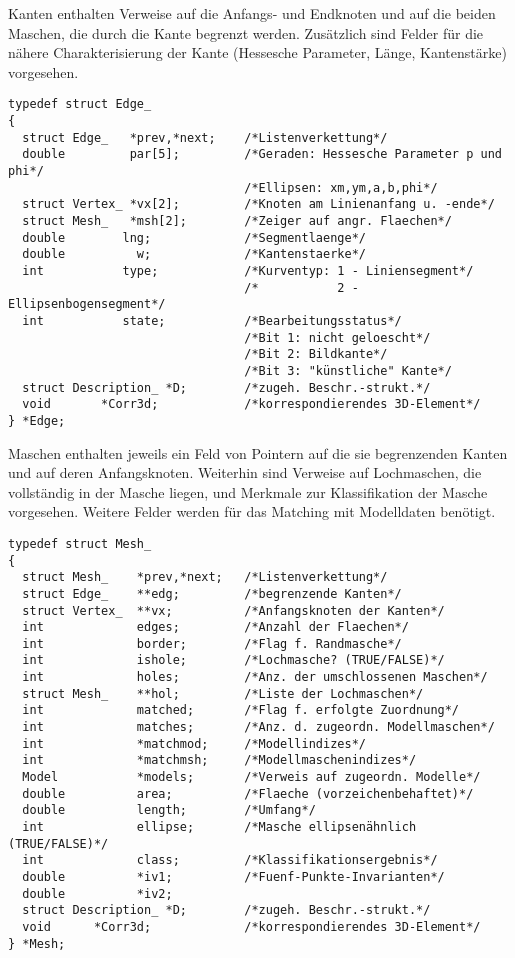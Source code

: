 Kanten enthalten Verweise auf die Anfangs- und Endknoten und auf die beiden
Maschen, die durch die Kante begrenzt werden. Zusätzlich sind Felder für die
nähere Charakterisierung der Kante (Hessesche Parameter, Länge, Kantenstärke)
vorgesehen.
\begprogr\begin{verbatim}
typedef struct Edge_
{ 
  struct Edge_   *prev,*next;    /*Listenverkettung*/
  double         par[5];         /*Geraden: Hessesche Parameter p und phi*/
                                 /*Ellipsen: xm,ym,a,b,phi*/
  struct Vertex_ *vx[2];         /*Knoten am Linienanfang u. -ende*/
  struct Mesh_   *msh[2];        /*Zeiger auf angr. Flaechen*/
  double        lng;             /*Segmentlaenge*/
  double          w;             /*Kantenstaerke*/
  int           type;            /*Kurventyp: 1 - Liniensegment*/
                                 /*           2 - Ellipsenbogensegment*/
  int           state;           /*Bearbeitungsstatus*/
                                 /*Bit 1: nicht geloescht*/
                                 /*Bit 2: Bildkante*/
                                 /*Bit 3: "künstliche" Kante*/
  struct Description_ *D;        /*zugeh. Beschr.-strukt.*/
  void       *Corr3d;            /*korrespondierendes 3D-Element*/
} *Edge;
\end{verbatim}\endprogr

Maschen enthalten jeweils ein Feld von Pointern auf die sie begrenzenden Kanten
und auf deren Anfangsknoten. Weiterhin sind Verweise auf Lochmaschen, die
vollständig in der Masche liegen, und Merkmale zur Klassifikation der Masche
vorgesehen. Weitere Felder werden für das Matching mit Modelldaten benötigt.
\begprogr\begin{verbatim}
typedef struct Mesh_
{
  struct Mesh_    *prev,*next;   /*Listenverkettung*/
  struct Edge_    **edg;         /*begrenzende Kanten*/
  struct Vertex_  **vx;          /*Anfangsknoten der Kanten*/
  int             edges;         /*Anzahl der Flaechen*/
  int             border;        /*Flag f. Randmasche*/
  int             ishole;        /*Lochmasche? (TRUE/FALSE)*/
  int             holes;         /*Anz. der umschlossenen Maschen*/
  struct Mesh_    **hol;         /*Liste der Lochmaschen*/
  int             matched;       /*Flag f. erfolgte Zuordnung*/
  int             matches;       /*Anz. d. zugeordn. Modellmaschen*/
  int             *matchmod;     /*Modellindizes*/
  int             *matchmsh;     /*Modellmaschenindizes*/
  Model           *models;       /*Verweis auf zugeordn. Modelle*/
  double          area;          /*Flaeche (vorzeichenbehaftet)*/
  double          length;        /*Umfang*/
  int             ellipse;       /*Masche ellipsenähnlich (TRUE/FALSE)*/
  int             class;         /*Klassifikationsergebnis*/
  double          *iv1;          /*Fuenf-Punkte-Invarianten*/
  double          *iv2;
  struct Description_ *D;        /*zugeh. Beschr.-strukt.*/
  void      *Corr3d;             /*korrespondierendes 3D-Element*/
} *Mesh;
\end{verbatim}\endprogr

